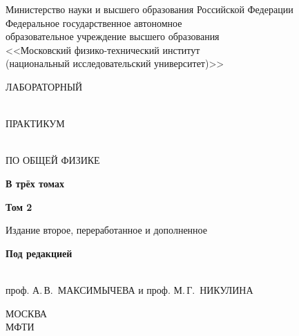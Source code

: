 \setcounter{page}{1}
\thispagestyle{empty}\mbox{}

\begingroup
\parindent=0pt\centering
{\scriptsize
Министерство науки и высшего образования Российской Федерации\\
Федеральное государственное автономное\\
образовательное учреждение высшего образования\\
<<Московский физико-технический институт\\ 
(национальный исследовательский университет)>>\par
}

\vskip 20mm

{\bfseries\LARGE\strut ЛАБОРАТОРНЫЙ\strut\\ ПРАКТИКУМ\strut\\ ПО ОБЩЕЙ ФИЗИКЕ\strut}

\vskip 10mm

{\bfseries\Large В трёх томах}

\vskip 10mm

{\bfseries\Large Том 2}

\vskip 5mm

{\bfseries\Large \MakeUppercase{\nazvan}}

\vskip 5mm

Издание второе, переработанное и дополненное

\vskip 20mm


\vskip 10mm

{\bfseries Под редакцией\strut\\
проф. А.\,В.~МАКСИМЫЧЕВА и проф. М.\,Г.~НИКУЛИНА\strut}

\vfill

{\small МОСКВА\\
МФТИ\\
\god}\par
\endgroup

\newpage
